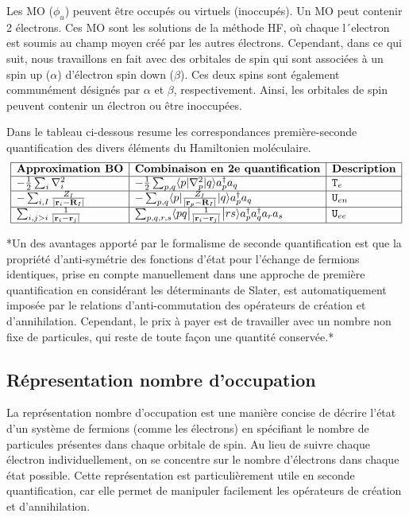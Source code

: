 \documentclass[12pt,a4paper]{article} %
\numberwithin{equation}{section} %
\numberwithin{figure}{section} %
\numberwithin{table}{section} %
\begin{document}
Les MO ($\phi_u$) peuvent être occupés ou virtuels (inoccupés). Un MO peut contenir 2 électrons. Ces MO sont les solutions de la méthode HF, où chaque l´electron est soumis au champ moyen créé par les autres électrons. Cependant, dans ce qui suit, nous travaillons en fait avec des orbitales de spin qui sont associées à un spin up ($\alpha$) d'électron spin down ($\beta$). Ces deux spins sont également communément désignés par $\alpha$ et $\beta$, respectivement. Ainsi, les orbitales de spin peuvent contenir un électron ou être inoccupées.

Dans le tableau ci-dessous resume les correspondances première-seconde quantification des divers éléments du Hamiltonien moléculaire. 
$$
\begin{array}{|l|l|l|}\hline
\textbf{Approximation BO}  &  \textbf{Combinaison en 2e quantification} &  \textbf{Description}
\\\hline
-\frac12\sum_i\nabla^2_i & -\frac12\sum_{p,q}\langle p|\nabla^2_p|q\rangle a^\dagger_p a_q & \mathtt{T}_e \\\hline
 -\sum_{i,I}\frac{Z_I}{|\mathbf{r}_i-\mathbf{R}_I|} &
 -\sum_{p,q} \langle p|\frac{Z_I}{|\mathbf{r}_p-\mathbf{R}_I|}|q\rangle a^\dagger_p a_q
 & \mathtt{U}_{en}\\\hline
\sum_{i,j>i}\frac{1}{|\mathbf{r}_i-\mathbf{r}_j|} & 
\sum_{p,q,r,s}\langle pq \big|\frac{1}{|\mathbf{r}_i-\mathbf{r}_j|}\big|rs\rangle a^\dagger_p a^\dagger_q a_r a_s & 
 \mathtt{U}_{ee}\\\hline
\end{array}
$$

*Un des avantages apporté par le formalisme de seconde quantification est que la propriété d'anti-symétrie des fonctions d'état pour l'échange de fermions identiques, prise en compte manuellement dans une approche de première quantification en considérant les déterminants de Slater, est automatiquement imposée par le relations d'anti-commutation des opérateurs de création et d'annihilation. Cependant, le prix à payer est de travailler avec un nombre non fixe de particules, qui reste de toute façon une quantité conservée.*

\subsection{Répresentation nombre d'occupation}

La représentation nombre d'occupation est une manière concise de décrire l'état d'un système de fermions (comme les électrons) en spécifiant le nombre de particules présentes dans chaque orbitale de spin. Au lieu de suivre chaque électron individuellement, on se concentre sur le nombre d'électrons dans chaque état possible. Cette représentation est particulièrement utile en seconde quantification, car elle permet de manipuler facilement les opérateurs de création et d'annihilation.
\end{document}

